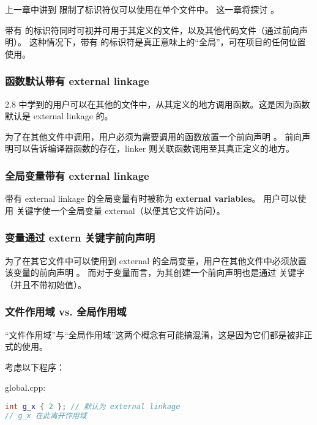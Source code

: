 \documentclass[../../LearnCpp.tex]{subfiles}
\begin{document}

上一章中讲到  限制了标识符仅可以使用在单个文件中。
这一章将探讨 。

带有  的标识符同时可视并可用于其定义的文件，以及其他代码文件（通过前向声明）。
这种情况下，带有  的标识符是真正意味上的“全局”，可在项目的任何位置使用。

\subsubsection*{函数默认带有 external linkage}

2.8 中学到的用户可以在其他的文件中，从其定义的地方调用函数。这是因为函数默认是 external linkage 的。

为了在其他文件中调用，用户必须为需要调用的函数放置一个前向声明 。
前向声明可以告诉编译器函数的存在，linker 则关联函数调用至其真正定义的地方。

\subsubsection*{全局变量带有 external linkage}

带有 external linkage 的全局变量有时被称为 \textbf{external variables}。
用户可以使用  关键字使一个全局变量 external（以便其它文件访问）。

\subsubsection*{变量通过 extern 关键字前向声明}

为了在其它文件中可以使用到 external 的全局变量，用户在其他文件中必须放置该变量的前向声明 。
而对于变量而言，为其创建一个前向声明也是通过  关键字（并且不带初始值）。

\subsubsection*{文件作用域 vs. 全局作用域}

“文件作用域”与“全局作用域”这两个概念有可能搞混淆，这是因为它们都是被非正式的使用。

考虑以下程序：

global.cpp:

\begin{lstlisting}[language=C++]
int g_x { 2 }; // 默认为 external linkage
// g_x 在此离开作用域
\end{lstlisting}
\end{document}
